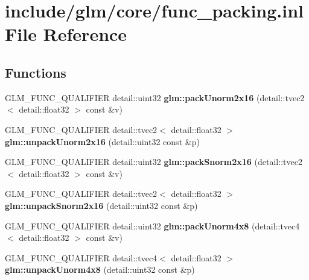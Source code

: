 \hypertarget{func__packing_8inl}{\section{include/glm/core/func\-\_\-packing.inl \-File \-Reference}
\label{func__packing_8inl}
}
\subsection*{\-Functions}
\begin{DoxyCompactItemize}
\item 
\hypertarget{namespaceglm_a38cc970d20075fda38a1725f668ec1e3}{\-G\-L\-M\-\_\-\-F\-U\-N\-C\-\_\-\-Q\-U\-A\-L\-I\-F\-I\-E\-R detail\-::uint32 {\bfseries glm\-::pack\-Unorm2x16} (detail\-::tvec2$<$ detail\-::float32 $>$ const \&v)}\label{namespaceglm_a38cc970d20075fda38a1725f668ec1e3}

\item 
\hypertarget{namespaceglm_ab69b3c1243e99a85e2e01f2bf0b85a9f}{\-G\-L\-M\-\_\-\-F\-U\-N\-C\-\_\-\-Q\-U\-A\-L\-I\-F\-I\-E\-R \*
detail\-::tvec2$<$ detail\-::float32 $>$ {\bfseries glm\-::unpack\-Unorm2x16} (detail\-::uint32 const \&p)}\label{namespaceglm_ab69b3c1243e99a85e2e01f2bf0b85a9f}

\item 
\hypertarget{namespaceglm_a25db573698cb49ea4c4ef96bfcebecf3}{\-G\-L\-M\-\_\-\-F\-U\-N\-C\-\_\-\-Q\-U\-A\-L\-I\-F\-I\-E\-R detail\-::uint32 {\bfseries glm\-::pack\-Snorm2x16} (detail\-::tvec2$<$ detail\-::float32 $>$ const \&v)}\label{namespaceglm_a25db573698cb49ea4c4ef96bfcebecf3}

\item 
\hypertarget{namespaceglm_abd170fa6d988e1396ab2c8c1ef263d04}{\-G\-L\-M\-\_\-\-F\-U\-N\-C\-\_\-\-Q\-U\-A\-L\-I\-F\-I\-E\-R \*
detail\-::tvec2$<$ detail\-::float32 $>$ {\bfseries glm\-::unpack\-Snorm2x16} (detail\-::uint32 const \&p)}\label{namespaceglm_abd170fa6d988e1396ab2c8c1ef263d04}

\item 
\hypertarget{namespaceglm_a4b10d27c4f1f5be5936b49ccc0d661ec}{\-G\-L\-M\-\_\-\-F\-U\-N\-C\-\_\-\-Q\-U\-A\-L\-I\-F\-I\-E\-R detail\-::uint32 {\bfseries glm\-::pack\-Unorm4x8} (detail\-::tvec4$<$ detail\-::float32 $>$ const \&v)}\label{namespaceglm_a4b10d27c4f1f5be5936b49ccc0d661ec}

\item 
\hypertarget{namespaceglm_ad8ae50c54c5db36e7915bfb3602feff5}{\-G\-L\-M\-\_\-\-F\-U\-N\-C\-\_\-\-Q\-U\-A\-L\-I\-F\-I\-E\-R \*
detail\-::tvec4$<$ detail\-::float32 $>$ {\bfseries glm\-::unpack\-Unorm4x8} (detail\-::uint32 const \&p)}\label{namespaceglm_ad8ae50c54c5db36e7915bfb3602feff5}


\end{DoxyCompactItemize}

